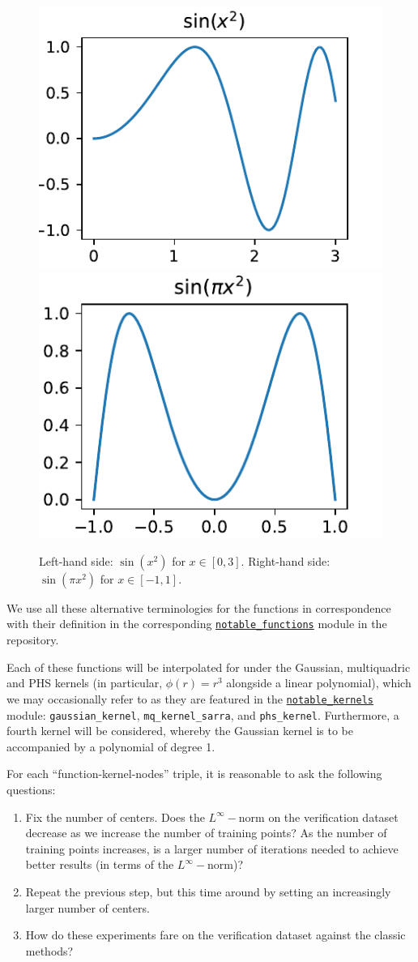 \documentclass[12pt]{report} %
\begin{document}
\begin{figure}[ht]
  \centering
  \includegraphics[width=.4\textwidth]{imagenes/experiments/1d/intro/sin_higher_oscillations.pdf}
  \includegraphics[width=.4\textwidth]{imagenes/experiments/1d/intro/sin_pi_x_sq.pdf}
  \caption{Left-hand side: $\sin (x^2)$ for $x \in [0,
        3]$. Right-hand side: $ \sin (\pi x^2)$ for $x \in [- 1, 1]$.}
  \label{fig:intro-control-functions}
\end{figure}

We use all these alternative terminologies for the functions in correspondence with their definition in the corresponding \href{https://github.com/heqro/tfm-experiments/blob/main/modules/notable_functions.py}{\texttt{notable\_functions}} module in the repository.

Each of these functions will be interpolated for under the Gaussian,
multiquadric and PHS kernels (in particular, $\phi(r)=r^3$ alongside a linear polynomial), which we may occasionally refer to as they are featured in the \href{https://github.com/heqro/tfm-experiments/blob/main/modules/notable_kernels.py}{\texttt{notable\_kernels}} module: \texttt{gaussian\_kernel}, \texttt{mq\_kernel\_sarra}, and \texttt{phs\_kernel}. Furthermore, a fourth kernel will be considered,
whereby the Gaussian kernel is to be accompanied by a polynomial of degree 1.


For each
``function-kernel-nodes'' triple, it is reasonable to ask the following
questions:

\begin{enumerate}[i]
  \item Fix the number of centers. Does the $L^{\infty}-$norm on the
        verification dataset decrease as we increase the number of training points?
        As the number of training points increases, is a larger number of iterations needed to achieve
        better results (in terms of the $L^{\infty}-$norm)?

  \item Repeat the previous step, but this time around by setting an increasingly larger
        number of centers.

  \item How do these experiments fare on the verification dataset against the
        classic methods?
\end{enumerate}
\end{document}

